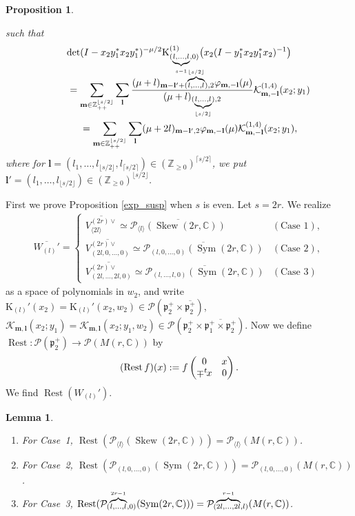 \documentclass[pdftex]{sigma}
\numberwithin{equation}{section}
\newtheorem{Lemma}[Theorem]{Lemma}
\newtheorem{Proposition}[Theorem]{Proposition}
{ \theoremstyle{definition}
\newtheorem{Definition}[Theorem]{Definition}
\newtheorem{Note}[Theorem]{Note}
\newtheorem{Example}[Theorem]{Example}
\newtheorem{Remark}[Theorem]{Remark} }
\newcommand{\bl}{\mathbf{l}}
\newcommand{\bm}{\mathbf{m}}
\newcommand{\BZ}{\mathbb{Z}}
\newcommand{\BC}{\mathbb{C}}
\newcommand{\fp}{\mathfrak{p}}
\newcommand{\cK}{\mathcal{K}}
\newcommand{\cP}{\mathcal{P}}
\newcommand{\rK}{\mathrm{K}}
\newcommand{\Sym}{\operatorname{Sym}}
\newcommand{\Skew}{\operatorname{Skew}}
\newcommand{\Rest}{\operatorname{Rest}}
\begin{document}
\begin{Proposition}
\begin{enumerate}
such that
\begin{gather*}
 \det(I-x_2y_1^*x_2y_1^*)^{-\mu/2}\rK_{(\underbrace{\scriptstyle l,\ldots,l}_{s-1},0)}^{(1)}\big(x_2(I-y_1^*x_2y_1^*x_2)^{-1}\big)\\
\qquad{} =\sum_{\bm\in\BZ_{++}^{\lfloor s/2\rfloor}}\sum_\bl
\frac{(\mu+l)_{\bm-\bl'+\smash{(\overbrace{\scriptstyle l,\dots,l}^{\lfloor s/2\rfloor}}),2}\varphi_{\bm,-\bl}(\mu)}
{(\mu+l)_{(\underbrace{\scriptstyle l,\ldots,l}_{\lfloor s/2\rfloor}),2}}
\cK_{\bm,-\bl}^{(1,4)}(x_2;y_1)\\
\qquad{} =\sum_{\bm\in\BZ_{++}^{\lfloor s/2\rfloor}}\sum_\bl (\mu+2l)_{\bm-\bl',2}\varphi_{\bm,-\bl}(\mu)\cK_{\bm,-\bl}^{(1,4)}(x_2;y_1),
\end{gather*}
where for $\bl=(l_1,\ldots,l_{\lfloor s/2\rfloor},l_{\lceil s/2\rceil})\in(\BZ_{\ge 0})^{\lceil s/2\rceil}$, we put
$\bl'=(l_1,\ldots,l_{\lfloor s/2\rfloor})\in(\BZ_{\ge 0})^{\lfloor s/2\rfloor}$.
\end{enumerate}
\end{Proposition}
First we prove Proposition \ref{exp_susp} when $s$ is even. Let $s=2r$. We realize
\begin{gather*} \overline{W_{(l)}'}=\begin{cases}
\overline{V_{\langle 2l\rangle}^{(2r)\vee}}\simeq \overline{\cP_{\langle l\rangle}(\Skew(2r,\BC))}&(\text{Case }1),\\
\overline{V_{(2l,0,\ldots,0)}^{(2r)\vee}}\simeq \overline{\cP_{(l,0,\ldots,0)}(\Sym(2r,\BC))}&(\text{Case }2),\\
\overline{V_{(2l,\ldots,2l,0)}^{(2r)\vee}}\simeq \overline{\cP_{(l,\ldots,l,0)}(\Sym(2r,\BC))}&(\text{Case }3)\end{cases} \end{gather*}
as a space of polynomials in $w_2$, and write $\rK_{(l)}'(x_2)=\rK_{(l)}'(x_2,w_2)\in\cP(\fp^+_2\times\overline{\fp^+_2})$,
$\cK_{\bm,\bl}(x_2;y_1)=\cK_{\bm,\bl}(x_2;y_1,w_2)\in\cP(\fp^+_2\times\overline{\fp^+_1\times\fp^+_2})$.
Now we define $\Rest\colon \cP(\fp^+_2)\to \cP(M(r,\BC))$ by
\begin{gather*} (\Rest f)(x):=f\begin{pmatrix} 0&x\\ \mp {}^t\hspace{-1pt}x&0 \end{pmatrix}. \end{gather*}
We find $\Rest(W_{(l)}')$.
\begin{Lemma}\quad
\begin{enumerate}\itemsep=0pt
\item[$(1)$] For Case~{\rm 1}, $\Rest(\cP_{\langle l\rangle}(\Skew(2r,\BC)))=\cP_{\langle l\rangle}(M(r,\BC))$.
\item[$(2)$] For Case~{\rm 2}, $\Rest(\cP_{(l,0,\ldots,0)}(\Sym(2r,\BC)))=\cP_{(l,0,\ldots,0)}(M(r,\BC))$. \vspace{2mm}

\item[$(3)$] For Case~{\rm 3}, $\Rest(\cP_{(\smash{\overbrace{\scriptstyle l,\ldots,l}^{2r-1}},0)}(\Sym(2r,\BC)))
=\cP_{(\smash{\overbrace{\scriptstyle 2l,\ldots,2l}^{r-1}},l)}(M(r,\BC))$.
\end{enumerate}
\end{Lemma}
\end{document}
